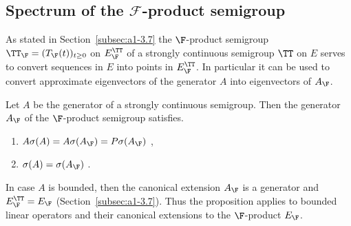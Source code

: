 \subsection{Spectrum of the 
\texorpdfstring{$\mathcal{F}$-product}{F-product} semigroup}\label{subsec:a3-4.5}
As stated in Section~\ref{subsec:a1-3.7} the $\F$-product semigroup $\TT_{\F} = (T_{\F}(t))_{t \geq 0}$ on $E_{\F}^{\TT}$ of a strongly continuous semigroup $\TT$ on $E$ serves to convert sequences in $E$ into points in $E_{\F}^{\TT}$.
In particular it can be used to convert approximate eigenvectors of the generator $A$ into eigenvectors of\/ $A_{\F}$.
\begin{proposition}\label{prop:a3-4.4}
Let $A$ be the generator of a strongly continuous semigroup. Then the generator $A_{\F}$ of the $\F$-product semigroup satisfies.
\begin{enumerate}[\upshape (i)]
\item 
	$A\sigma(A) = A\sigma(A_{\F}) = P\sigma(A_{\F})$ ,

\item 
	$\sigma(A) = \sigma(A_{\F})$ .
\end{enumerate}
\end{proposition}
\begin{remark}
In case $A$ is bounded, then the canonical extension $A_{\F}$ is a generator and $E_{\F}^{\TT} = E_{\F}$ (\cf Section~\ref{subsec:a1-3.7}).
Thus the proposition applies to bounded linear operators and their canonical extensions to the 
$\F$-product $E_{\F}$.
\end{remark}
